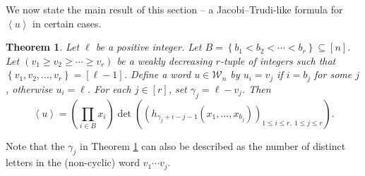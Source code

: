 \documentclass[reqno]{amsart}%
\newcommand{\0}{\phantom{c}}
\let\prodnonlimits\prod
\renewcommand{\prod}{\prodnonlimits\limits}
\theoremstyle{plain}
\newtheorem{thm}{Theorem}[section]
\theoremstyle{definition}
\numberwithin{equation}{section}
\begin{document}
We now state the main result of this section -- a Jacobi--Trudi-like formula
for $\left\langle u\right\rangle $ in certain cases.

\begin{thm}
\label{thm:determinant_form} Let $\ell$ be a positive integer. Let $B=\left\{
b_{1}<b_{2}<\cdots<b_{r}\right\}  \subseteq\left[  n\right]  $. Let $\left(
v_{1}\geq v_{2}\geq\dotsm\geq v_{r}\right)  $ be a weakly decreasing $r$-tuple
of integers such that $\left\{  v_{1},v_{2},\ldots,v_{r}\right\}  =\left[
\ell-1\right]  $. Define a word $u\in\mathcal{W}_{n}$ by $u_{i}=v_{j}$ if
$i=b_{j}$ for some $j$, otherwise $u_{i}=\ell$. For each $j\in\left[
r\right]  $, set $\gamma_{j}=\ell-v_{j}$. Then
\[
\left\langle u\right\rangle =\left(  \prod_{i\in B}x_{i}\right)  \det\left(
\left(  h_{\gamma_{j}+i-j-1}(x_{1},\dotsc,x_{b_{j}})\right)  _{1\leq i\leq
r,\ 1\leq j\leq r}\right)  .
\]

\end{thm}

Note that the $\gamma_{j}$ in Theorem \ref{thm:determinant_form} can also be
described as the number of distinct letters in the (non-cyclic) word
$v_{1}\dotsm v_{j}$.
\end{document}
